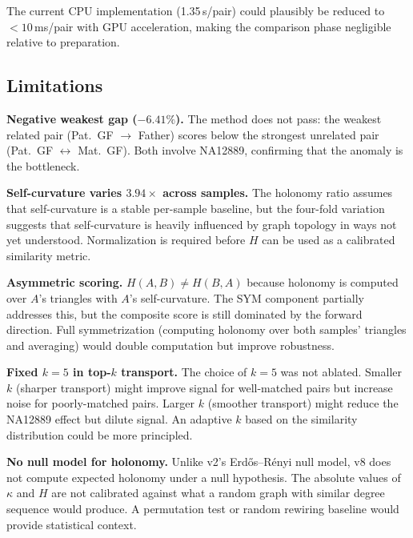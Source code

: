 \documentclass{../yalumba}
\begin{document}
The current CPU implementation (1.35\,s/pair) could plausibly be reduced to
$< 10$\,ms/pair with GPU acceleration, making the comparison phase negligible
relative to preparation.

\subsection{Limitations}

\begin{limitation}
\textbf{Negative weakest gap ($-6.41\%$).}  The method does not pass: the
weakest related pair (Pat.~GF $\to$ Father) scores below the strongest
unrelated pair (Pat.~GF $\leftrightarrow$ Mat.~GF).  Both involve NA12889,
confirming that the anomaly is the bottleneck.
\end{limitation}

\begin{limitation}
\textbf{Self-curvature varies $3.94\times$ across samples.}  The holonomy
ratio assumes that self-curvature is a stable per-sample baseline, but the
four-fold variation suggests that self-curvature is heavily influenced by
graph topology in ways not yet understood.  Normalization is required before
$H$ can be used as a calibrated similarity metric.
\end{limitation}

\begin{limitation}
\textbf{Asymmetric scoring.}  $H(A,B) \neq H(B,A)$ because holonomy is
computed over $A$'s triangles with $A$'s self-curvature.  The SYM component
partially addresses this, but the composite score is still dominated by the
forward direction.  Full symmetrization (computing holonomy over both
samples' triangles and averaging) would double computation but improve
robustness.
\end{limitation}

\begin{limitation}
\textbf{Fixed $k = 5$ in top-$k$ transport.}  The choice of $k = 5$ was
not ablated.  Smaller $k$ (sharper transport) might improve signal for
well-matched pairs but increase noise for poorly-matched pairs.  Larger
$k$ (smoother transport) might reduce the NA12889 effect but dilute signal.
An adaptive $k$ based on the similarity distribution could be more principled.
\end{limitation}

\begin{limitation}
\textbf{No null model for holonomy.}  Unlike v2's Erd\H{o}s--R\'enyi null
model, v8 does not compute expected holonomy under a null hypothesis.  The
absolute values of $\kappa$ and $H$ are not calibrated against what a
random graph with similar degree sequence would produce.  A permutation
test or random rewiring baseline would provide statistical context.
\end{limitation}
\end{document}

